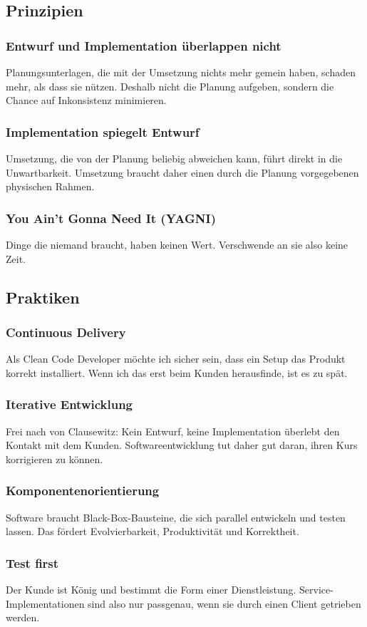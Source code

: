 \documentclass[a5paper, landscape]{article}
\begin{document}
	\newpage
	\begin{minipage}[t]{.5\textwidth}
		\subsection*{Prinzipien}
		\subsubsection*{Entwurf und Implementation überlappen nicht}
		Planungsunterlagen, die mit der Umsetzung nichts mehr gemein haben, schaden mehr, als dass sie nützen. Deshalb nicht die Planung aufgeben, sondern die Chance auf Inkonsistenz minimieren.
		\subsubsection*{Implementation spiegelt Entwurf}
		Umsetzung, die von der Planung beliebig abweichen kann, führt direkt in die Unwartbarkeit. Umsetzung braucht daher einen durch die Planung vorgegebenen physischen Rahmen.
		\subsubsection*{You Ain't Gonna Need It (YAGNI)}
		Dinge die niemand braucht, haben keinen Wert. Verschwende an sie also keine Zeit.
	\end{minipage}
	\hspace{0.5cm}
	\begin{minipage}[t]{.5\textwidth}
		\subsection*{Praktiken}
		\subsubsection*{Continuous Delivery}
		Als Clean Code Developer möchte ich sicher sein, dass ein Setup das Produkt korrekt installiert. Wenn ich das erst beim Kunden herausfinde, ist es zu spät.
		\subsubsection*{Iterative Entwicklung}
		Frei nach von Clausewitz: Kein Entwurf, keine Implementation überlebt den Kontakt mit dem Kunden. Softwareentwicklung tut daher gut daran, ihren Kurs korrigieren zu können.
		\subsubsection*{Komponentenorientierung}
		Software braucht Black-Box-Bausteine, die sich parallel entwickeln und testen lassen. Das fördert Evolvierbarkeit, Produktivität und Korrektheit.
		\subsubsection*{Test first}
		Der Kunde ist König und bestimmt die Form einer Dienstleistung. Service-Implementationen sind also nur passgenau, wenn sie durch einen Client getrieben werden.
	\end{minipage}
\end{document}
